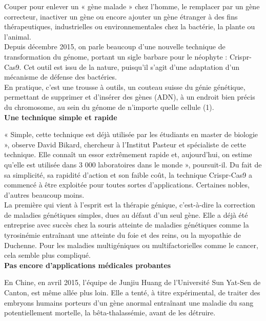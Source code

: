 \documentclass[8pt]{article}
\begin{document}
Couper pour enlever un « gène malade » chez l’homme, le remplacer par un gène correcteur, inactiver un gène ou encore ajouter un gène étranger à des fins thérapeutiques, industrielles ou environnementales chez la bactérie, la plante ou l’animal.\\

Depuis décembre 2015, on parle beaucoup d’une nouvelle technique de transformation du génome, portant un sigle barbare pour le néophyte : Crispr-Cas9. Cet outil est issu de la nature, puisqu’il s’agit d’une adaptation d’un mécanisme de défense des bactéries.\\

En pratique, c’est une trousse à outils, un couteau suisse du génie génétique, permettant de supprimer et d’insérer des gènes (ADN), à un endroit bien précis du chromosome, au sein du génome de n’importe quelle cellule (1). \\

\textbf{Une technique simple et rapide}

« Simple, cette technique est déjà utilisée par les étudiants en master de biologie », observe David Bikard, chercheur à l’Institut Pasteur et spécialiste de cette technique. Elle connaît un essor extrêmement rapide et, aujourd’hui, on estime qu’elle est utilisée dans 3 000 laboratoires dans le monde », poursuit-il. Du fait de sa simplicité, sa rapidité d’action et son faible coût, la technique Crispr-Cas9 a commencé à être exploitée pour toutes sortes d’applications. Certaines nobles, d’autres beaucoup moins.\\


La première qui vient à l’esprit est la thérapie génique, c’est-à-dire la correction de maladies génétiques simples, dues au défaut d’un seul gène. Elle a déjà été entreprise avec succès chez la souris atteinte de maladies génétiques comme la tyrosinémie entraînant une atteinte du foie et des reins, ou la myopathie de Duchenne. Pour les maladies multigéniques ou multifactorielles comme le cancer, cela semble plus compliqué. \\

\textbf{Pas encore d’applications médicales probantes}

En Chine, en avril 2015, l’équipe de Junjiu Huang de l’Université Sun Yat-Sen de Canton, est même allée plus loin. Elle a tenté, à titre expérimental, de traiter des embryons humains porteurs d’un gène anormal entraînant une maladie du sang potentiellement mortelle, la bêta-thalassémie, avant de les détruire.\\
\end{document}
